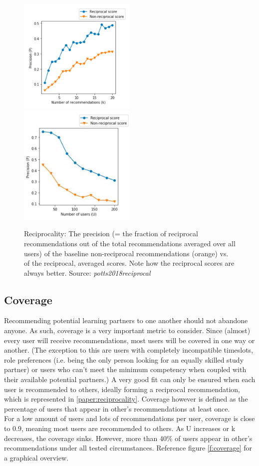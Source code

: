 \documentclass[nochapterpage,bigchapter,linedtoc,longdoc,colorback,accentcolor=tud3b,oneside]{tudreport}
\begin{document}
\begin{figure}[p]
	\includegraphics[width=0.5\textwidth]{g/PrecisionByK.PNG}
	\includegraphics[width=0.5\textwidth]{g/PrecisionByU.PNG}
	\caption{Reciprocality: The precision (= the fraction of reciprocal recommendations out of the total recommendations averaged over all users) of the baseline non-reciprocal recommendations (orange) vs. of the reciprocal, averaged scores. Note how the reciprocal scores are always better. Source: \textit{potts2018reciprocal}}
	\label{f:reciprocality}
\end{figure}

\subsection{Coverage} \label{paper:coverage}
Recommending potential learning partners to one another should not abandone anyone. As such, coverage is a very important metric to consider. Since (almost) every user will receive recommendations, most users will be covered in one way or another. (The exception to this are users with completely incompatible timeslots, role preferences (i.e. being the only person looking for an equally skilled study partner) or users who can't meet the minimum competency when coupled with their available potential partners.) A very good fit can only be ensured when each user is recommended to others, ideally forming a reciprocal recommendation, which is represented in \ref{paper:reciprocality}. Coverage however is defined as the percentage of users that appear in other's recommendations at least once.\\
For a low amount of users and lots of recommendations per user, coverage is close to 0.9, meaning most users are recommended to others. As U increases or k decreases, the coverage sinks. However, more than 40\% of users appear in other's recommendations under all tested circumstances. Reference figure \ref{f:coverage} for a graphical overview.\\
\end{document}
